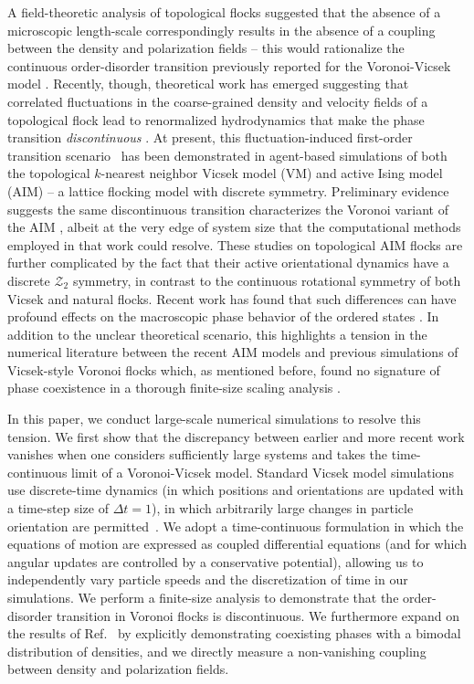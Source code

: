 \documentclass[twoside,twocolumn,9pt]{article}
\begin{document}
A field-theoretic analysis of topological flocks suggested that the absence of a microscopic length-scale correspondingly results in the absence of a coupling between the density and polarization fields \cite{peshkov2012continuous,chou2012kinetic} -- this would rationalize the continuous order-disorder transition previously reported for the Voronoi-Vicsek model \cite{ginelli2010relevance}.
Recently, though, theoretical work has emerged suggesting that correlated fluctuations in the coarse-grained density and velocity fields of a topological flock lead to renormalized hydrodynamics that make the phase transition \emph{discontinuous} \cite{martin2021fluctuation}.
At present, this fluctuation-induced first-order transition scenario~\cite{binder1987theory} has been demonstrated in agent-based simulations of both the topological $k$-nearest neighbor Vicsek model (VM) \cite{martin2021fluctuation} and active Ising model (AIM) -- a lattice flocking model with discrete symmetry.
Preliminary evidence suggests the same discontinuous transition characterizes the Voronoi variant of the AIM \cite{martin2024fluctuation}, albeit at the very edge of system size that the computational methods employed in that work could resolve.
These studies on topological AIM flocks are further complicated by the fact that their active orientational dynamics have a discrete $\mathcal{Z}_2$ symmetry, in contrast to the continuous rotational symmetry of both Vicsek and natural flocks.
Recent work has found that such differences can have profound effects on the macroscopic phase behavior of the ordered states \cite{karmakar2024consequence}.
In addition to the unclear theoretical scenario, this highlights a tension in the numerical literature between the recent AIM models and previous simulations of Vicsek-style Voronoi flocks which, as mentioned before, found no signature of phase coexistence in a thorough finite-size scaling analysis \cite{ginelli2010relevance}.

In this paper, we conduct large-scale numerical simulations to resolve this tension.
We first show that the discrepancy between earlier \cite{ginelli2010relevance} and more recent \cite{martin2024fluctuation} work vanishes when one considers sufficiently large systems and takes the time-continuous limit of a Voronoi-Vicsek model.
Standard Vicsek model simulations use discrete-time dynamics (in which positions and orientations are updated with a time-step size of $\Delta t = 1$), in which arbitrarily large changes in particle orientation are permitted~\cite{vicsek1995novel}.
We adopt a time-continuous formulation \cite{cavagna2018physics} in which the equations of motion are expressed as coupled differential equations (and for which angular updates are controlled by a conservative potential), allowing us to independently vary particle speeds and the discretization of time in our simulations.
We perform a finite-size analysis to demonstrate that the order-disorder transition in Voronoi flocks is discontinuous.
We furthermore expand on the results of Ref.~\cite{martin2024fluctuation} by explicitly demonstrating coexisting phases with a bimodal distribution of densities, and we directly measure a non-vanishing coupling between density and polarization fields.
\end{document}
